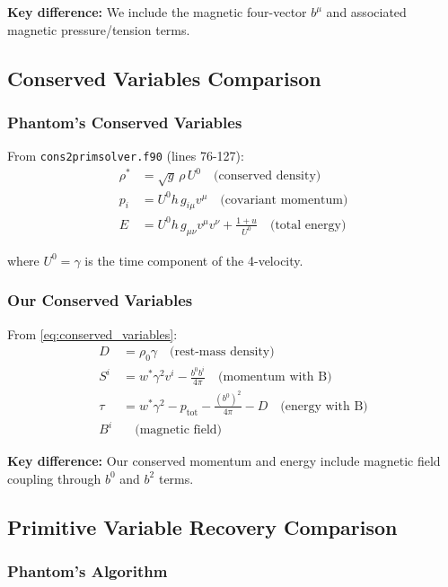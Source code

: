 \documentclass[12pt,a4paper]{article}
\begin{document}
\textbf{Key difference:} We include the magnetic four-vector $b^\mu$ and associated
magnetic pressure/tension terms.

\subsection{Conserved Variables Comparison}

\subsubsection{Phantom's Conserved Variables}

From \texttt{cons2primsolver.f90} (lines 76-127):
\begin{align}
\rho^* &= \sqrt{g} \, \rho \, U^0 \quad \text{(conserved density)} \\
p_i &= U^0 h \, g_{i\mu} v^\mu \quad \text{(covariant momentum)} \\
E &= U^0 h \, g_{\mu\nu} v^\mu v^\nu + \frac{1+u}{U^0} \quad \text{(total energy)}
\end{align}

where $U^0 = \gamma$ is the time component of the 4-velocity.

\subsubsection{Our Conserved Variables}

From \eqref{eq:conserved_variables}:
\begin{align}
D &= \rho_0 \gamma \quad \text{(rest-mass density)} \\
S^i &= w^* \gamma^2 v^i - \frac{b^0 b^i}{4\pi} \quad \text{(momentum with B)} \\
\tau &= w^* \gamma^2 - p_\text{tot} - \frac{(b^0)^2}{4\pi} - D \quad \text{(energy with B)} \\
B^i &\quad \text{(magnetic field)}
\end{align}

\textbf{Key difference:} Our conserved momentum and energy include magnetic field
coupling through $b^0$ and $b^2$ terms.

\subsection{Primitive Variable Recovery Comparison}

\subsubsection{Phantom's Algorithm}
\end{document}
